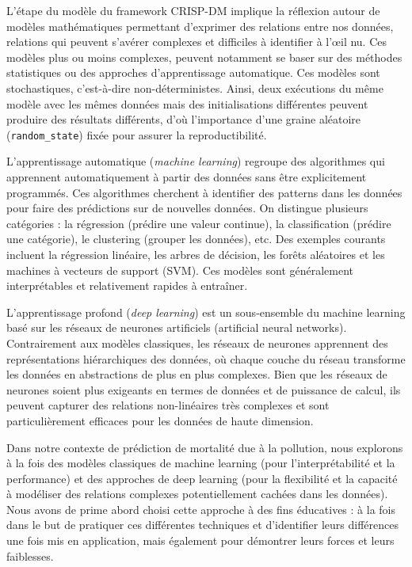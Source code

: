 \documentclass[11pt,a4paper]{article}
\begin{document}
L'étape du modèle du framework CRISP-DM implique la réflexion autour de modèles mathématiques permettant d'exprimer des relations entre nos données, relations qui peuvent s'avérer complexes et difficiles à identifier à l'œil nu. Ces modèles plus ou moins complexes, peuvent notamment se baser sur des méthodes statistiques ou des approches d'apprentissage automatique. Ces modèles sont stochastiques, c'est-à-dire non-déterministes. Ainsi, deux exécutions du même modèle avec les mêmes données mais des initialisations différentes peuvent produire des résultats différents, d'où l'importance d'une graine aléatoire (\lstinline{random_state}) fixée pour assurer la reproductibilité.

L'apprentissage automatique (\textit{machine learning}) regroupe des algorithmes qui apprennent automatiquement à partir des données sans être explicitement programmés. Ces algorithmes cherchent à identifier des patterns dans les données pour faire des prédictions sur de nouvelles données. On distingue plusieurs catégories : la régression (prédire une valeur continue), la classification (prédire une catégorie), le clustering (grouper les données), etc. Des exemples courants incluent la régression linéaire, les arbres de décision, les forêts aléatoires et les machines à vecteurs de support (SVM). Ces modèles sont généralement interprétables et relativement rapides à entraîner.

L'apprentissage profond (\textit{deep learning}) est un sous-ensemble du machine learning basé sur les réseaux de neurones artificiels (artificial neural networks). Contrairement aux modèles classiques, les réseaux de neurones apprennent des représentations hiérarchiques des données, où chaque couche du réseau transforme les données en abstractions de plus en plus complexes. Bien que les réseaux de neurones soient plus exigeants en termes de données et de puissance de calcul, ils peuvent capturer des relations non-linéaires très complexes et sont particulièrement efficaces pour les données de haute dimension.

Dans notre contexte de prédiction de mortalité due à la pollution, nous explorons à la fois des modèles classiques de machine learning (pour l'interprétabilité et la performance) et des approches de deep learning (pour la flexibilité et la capacité à modéliser des relations complexes potentiellement cachées dans les données). Nous avons de prime abord choisi cette approche à des fins éducatives : à la fois dans le but de pratiquer ces différentes techniques et d'identifier leurs différences une fois mis en application, mais également pour démontrer leurs forces et leurs faiblesses.
\end{document}
